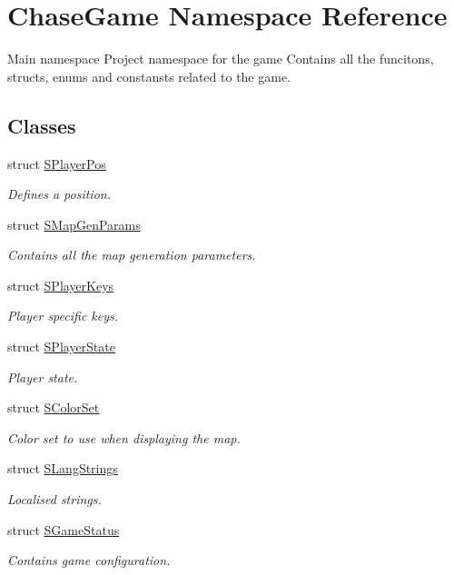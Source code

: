 \hypertarget{namespace_chase_game}{\section{Chase\-Game Namespace Reference}
\label{namespace_chase_game}
}


Main namespace Project namespace for the game Contains all the funcitons, structs, enums and constansts related to the game.  


\subsection*{Classes}
\begin{DoxyCompactItemize}
\item 
struct \hyperlink{struct_chase_game_1_1_s_player_pos}{S\-Player\-Pos}
\begin{DoxyCompactList}\small\item\em Defines a position. \end{DoxyCompactList}\item 
struct \hyperlink{struct_chase_game_1_1_s_map_gen_params}{S\-Map\-Gen\-Params}
\begin{DoxyCompactList}\small\item\em Contains all the map generation parameters. \end{DoxyCompactList}\item 
struct \hyperlink{struct_chase_game_1_1_s_player_keys}{S\-Player\-Keys}
\begin{DoxyCompactList}\small\item\em Player specific keys. \end{DoxyCompactList}\item 
struct \hyperlink{struct_chase_game_1_1_s_player_state}{S\-Player\-State}
\begin{DoxyCompactList}\small\item\em Player state. \end{DoxyCompactList}\item 
struct \hyperlink{struct_chase_game_1_1_s_color_set}{S\-Color\-Set}
\begin{DoxyCompactList}\small\item\em Color set to use when displaying the map. \end{DoxyCompactList}\item 
struct \hyperlink{struct_chase_game_1_1_s_lang_strings}{S\-Lang\-Strings}
\begin{DoxyCompactList}\small\item\em Localised strings. \end{DoxyCompactList}\item 
struct \hyperlink{struct_chase_game_1_1_s_game_status}{S\-Game\-Status}
\begin{DoxyCompactList}\small\item\em Contains game configuration. \end{DoxyCompactList}\end{DoxyCompactItemize}
